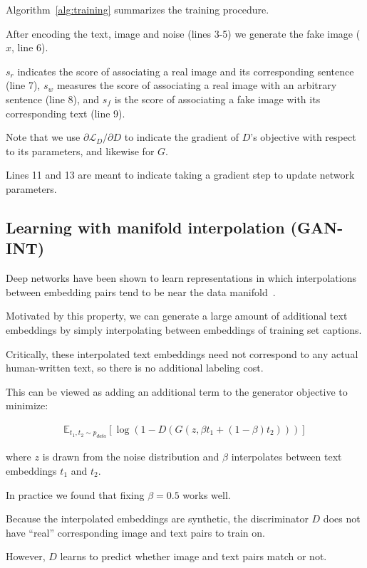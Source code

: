 Algorithm~\autoref{alg:training} summarizes the training procedure. 

After encoding the text, image and noise (lines 3-5) we generate the fake image ($\hat{x}$, line 6).

$s_{r}$ indicates the score of associating a real image and its corresponding sentence (line 7), $s_{w}$ measures the score of associating a real image with an arbitrary sentence (line 8), and $s_{f}$ is the score of associating a fake image with its corresponding text (line 9).

Note that we use $\partial \mathcal{L}_{D} / \partial D$ to indicate the gradient of $D$'s objective with respect to its parameters, and likewise for $G$.

Lines 11 and 13 are meant to indicate taking a gradient step to update network parameters.

\subsection{Learning with manifold interpolation (GAN-INT)}
\label{subsec:GAN-INT}

Deep networks have been shown to learn representations in which interpolations between embedding pairs tend to be near the data manifold~\cite{bengio2013better,reed2014learning}.

Motivated by this property, we can generate a large amount of additional text embeddings by simply interpolating between embeddings of training set captions.

Critically, these interpolated text embeddings need not correspond to any actual human-written text, so there is no additional labeling cost.

This can be viewed as adding an additional term to the generator objective to minimize:

\begin{align}
\mathbb{E}_{t_1,t_2 \sim p_{data}}[ \log (1 - D(G(z, \beta t_1 + (1-\beta) t_2 ))) ]
\end{align}

where $z$ is drawn from the noise distribution and $\beta$ interpolates between text embeddings $t_1$ and $t_2$.

In practice we found that fixing $\beta = 0.5$ works well.

Because the interpolated embeddings are synthetic, the discriminator $D$ does not have ``real'' corresponding image and text pairs to train on.

However, $D$ learns to predict whether image and text pairs match or not.


